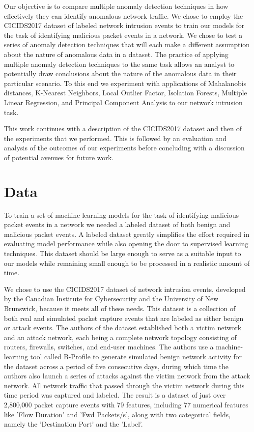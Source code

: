 \documentclass[conference]{IEEEtran}
\begin{document}
Our objective is to compare multiple anomaly detection techniques in how effectively they can identify anomalous network traffic. We chose to employ the CICIDS2017 dataset of labeled network intrusion events to train our models for the task of identifying malicious packet events in a network. We chose to test a series of anomaly detection techniques that will each make a different assumption about the nature of anomalous data in a dataset. The practice of applying multiple anomaly detection techniques to the same task allows an analyst to potentially draw conclusions about the nature of the anomalous data in their particular scenario. To this end we experiment with applications of Mahalanobis distances, K-Nearest Neighbors, Local Outlier Factor, Isolation Forests, Multiple Linear Regression, and Principal Component Analysis to our network intrusion task.

This work continues with a description of the CICIDS2017 dataset and then of the experiments that we performed. This is followed by an evaluation and analysis of the outcomes of our experiments before concluding with a discussion of potential avenues for future work.

\section{Data}

To train a set of machine learning models for the task of identifying malicious packet events in a network we needed a labeled dataset of both benign and malicious packet events. A labeled dataset greatly simplifies the effort required in evaluating model performance while also opening the door to supervised learning techniques. This dataset should be large enough to serve as a suitable input to our models while remaining small enough to be processed in a realistic amount of time.

We chose to use the CICIDS2017 dataset of network intrusion events, developed by the Canadian Institute for Cybersecurity and the University of New Brunswick, because it meets all of these needs. This dataset is a collection of both real and simulated packet capture events that are labeled as either benign or attack events. The authors of the dataset established both a victim network and an attack network, each being a complete network topology consisting of routers, firewalls, switches, and end-user machines. The authors use a machine-learning tool called B-Profile to generate simulated benign network activity for the dataset across a period of five consecutive days, during which time the authors also launch a series of attacks against the victim network from the attack network. All network traffic that passed through the victim network during this time period was captured and labeled. The result is a dataset of just over 2,800,000 packet capture events with 79 features, including 77 numerical features like 'Flow Duration' and 'Fwd Packets/s', along with two categorical fields, namely the 'Destination Port' and the 'Label'.
\end{document}
